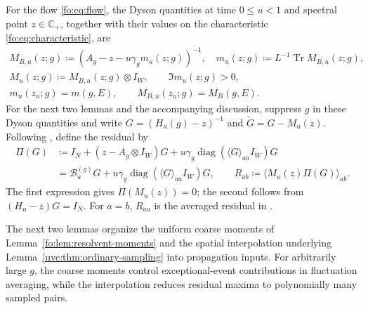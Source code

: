 \documentclass[11pt]{article}
\numberwithin{equation}{section}
\theoremstyle{remark}
\newcommand{\C}{\mathbb C}
\newcommand{\Tr}{\operatorname{Tr}}
\newcommand{\wt}{\widetilde}
\newcommand{\diag}{\operatorname{diag}}
\begin{document}
For the flow \eqref{fo:eq:flow}, the Dyson quantities at time
$0\le u<1$ and spectral point $z\in\C_+$, together with their values
on the characteristic \eqref{fo:eq:characteristic}, are
\begin{equation}\label{gc:eq:positive-dyson}
 \begin{gathered}
 M_{B,u}(z;g)\coloneqq(A_g-z-u\gamma_gm_u(z;g))^{-1},\quad
 m_u(z;g)\coloneqq L^{-1}\Tr M_{B,u}(z;g),\\
 M_u(z;g)\coloneqq M_{B,u}(z;g)\otimes I_W,\qquad
 \Im m_u(z;g)>0,\\
 m_u(z_u;g)=m(g,E),\qquad M_{B,u}(z_u;g)=M_B(g,E).
 \end{gathered}
\end{equation}
For the next two lemmas and the accompanying discussion, suppress $g$
in these Dyson quantities and write
$G=(H_u(g)-z)^{-1}$ and $\wt G=G-M_u(z)$.
Following \cite[definition preceding (6.37)]{TYY}, define the residual by
\begin{equation}\label{gc:eq:residual-input}
 \begin{aligned}
 \Pi(G)&\coloneqq I_N+(z-A_g\otimes I_W)G
              +u\gamma_g\diag(\langle G\rangle_{aa}I_W)G\\
 &=\mathcal B_u^{(g)}G+u\gamma_g\diag(\langle G\rangle_{aa}I_W)G,
 \qquad R_{ab}\coloneqq\langle M_u(z)\Pi(G)\rangle_{ab}.
 \end{aligned}
\end{equation}
The first expression gives $\Pi(M_u(z))=0$; the second follows from
$(H_u-z)G=I_N$. For $a=b$, $R_{aa}$ is the averaged residual in
\cite[(6.50)]{TYY}.

The next two lemmas organize the uniform coarse moments of
Lemma~\ref{fo:lem:resolvent-moments} and the spatial interpolation
underlying Lemma~\ref{uvc:thm:ordinary-sampling} into propagation inputs.
For arbitrarily large $g$, the coarse moments control exceptional-event
contributions in fluctuation averaging, while the interpolation reduces
residual maxima to polynomially many sampled pairs.
\end{document}
